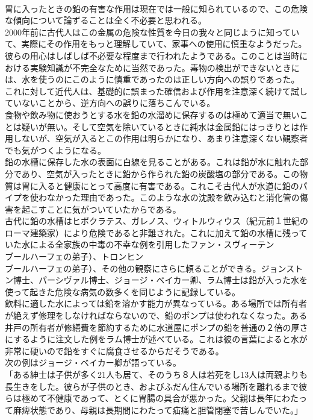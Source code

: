 \documentclass[8pt]{extreport}
\begin{document}
\begin{CJK}{UTF8}{min}
\\	胃に入ったときの鉛の有害な作用は現在では一般に知られているので、この危険な傾向について論ずることは全く不必要と思われる。
\\	2000年前に古代人はこの金属の危険な性質を今日の我々と同じように知っていて、実際にその作用をもっと理解していて、家事への使用に慎重なようだった。
\\	彼らの用心はしばしば不必要な程度まで行われたようである。このことは当時における実験知識が不完全なために当然であった。毒物の検出ができないときには、水を使うのにこのように慎重であったのは正しい方向への誤りであった。
\\	これに対して近代人は、基礎的に誤まった確信および作用を注意深く続けて試していないことから、逆方向への誤りに落ちこんでいる。
\\	食物や飲み物に使おうとする水を鉛の水溜めに保存するのは極めて適当で無いことは疑いが無い。そして空気を除いているときに純水は金属鉛にはっきりとは作用しないが、空気が入るとこの作用は明らかになり、あまり注意深くない観察者でも気がつくようになる。
\\	鉛の水槽に保存した水の表面に白線を見ることがある。これは鉛が水に触れた部分であり、空気が入ったときに鉛から作られた鉛の炭酸塩の部分である。この物質は胃に入ると健康にとって高度に有害である。これこそ古代人が水道に鉛のパイプを使わなかった理由であった。このような水の沈殿を飲み込むと消化管の傷害を起こすことに気がついていたからである。
\\	古代に鉛の水槽はヒポクラテス、ガレノス、ウィトルウィウス（紀元前１世紀のローマ建築家）により危険であると非難された。これに加えて鉛の水槽に残っていた水による全家族の中毒の不幸な例を引用したファン・スヴィーテン
\\	ブールハーフェの弟子）、トロンヒン
\\	ブールハーフェの弟子）、その他の観察にさらに頼ることができる。ジョンストン博士、パーシヴァル博士、ジョージ・ベイカー卿、ラム博士は鉛が入った水を使って起きた危険な病気の数多くを同じように記録している。
\\	飲料に適した水によっては鉛を溶かす能力が異なっている。ある場所では所有者が絶えず修理をしなければならないので、鉛のポンプは使われなくなった。ある井戸の所有者が修繕費を節約するために水道屋にポンプの鉛を普通の２倍の厚さにするように注文した例をラム博士が述べている。これは彼の言葉によると水が非常に硬いので鉛をすぐに腐食させるからだそうである。
\\	次の例はジョージ・ベイカー卿が語っている。
\\	「ある紳士は子供が多く21人も居て、そのうち８人は若死をし13人は両親よりも長生きをした。彼らが子供のとき、およびふだん住んでいる場所を離れるまで彼らは極めて不健康であって、とくに胃腸の具合が悪かった。父親は長年にわたって麻痺状態であり、母親は長期間にわたって疝痛と胆管閉塞で苦しんでいた。」

\end{CJK}
\end{document}
